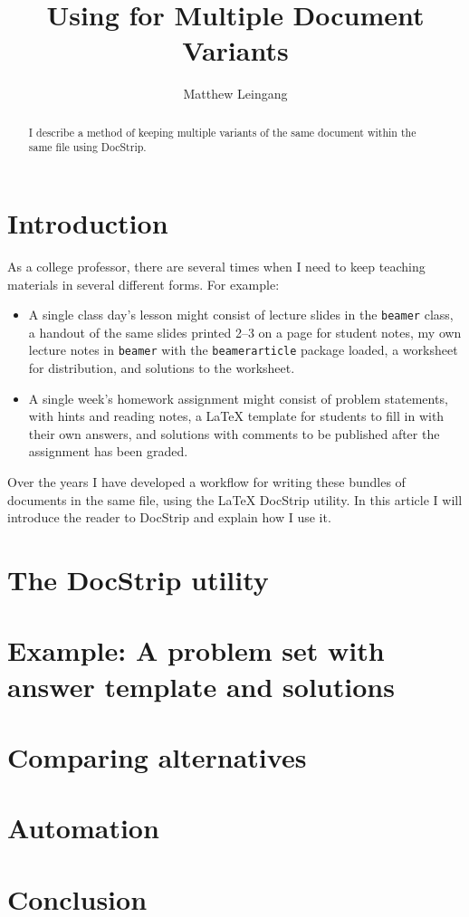 \documentclass{ltugboat}
\title{Using \docstrip{} for Multiple Document Variants}
\author{Matthew Leingang}
\newcommand{\cls}[1]{\texttt{#1}}
\newcommand{\pkg}[1]{\texttt{#1}}
\newcommand{\docstrip}{\textsf{DocStrip}}
\begin{document}
\maketitle

\begin{abstract}
    I describe a method of keeping multiple variants of the same document
    within the same file using \docstrip.
\end{abstract}

\section{Introduction}

As a college professor, there are several times when I need to keep teaching
materials in several different forms.  For example:

\begin{itemize}
    \item A single class day's lesson might consist of lecture slides in the
    \cls{beamer} class, a handout of the same slides printed 2–3 on a page for
    student notes, my own lecture notes in \cls{beamer} with the
    \pkg{beamerarticle} package loaded, a worksheet for distribution, and
    solutions to the worksheet.

    \item A single week's homework assignment might consist of problem
    statements, with hints and reading notes, a \LaTeX{} template for students
    to fill in with their own answers, and solutions with comments to be
    published after the assignment has been graded.
\end{itemize}

Over the years I have developed a workflow for writing these bundles of
documents in the same file, using the \LaTeX{} \docstrip{} utility.  In this
article I will introduce the reader to \docstrip{} and explain how I use it.

\section{The \docstrip{} utility}

\section{Example: A problem set with answer template and solutions}

\section{Comparing alternatives}

\section{Automation}

\section{Conclusion}

\nocite{book-minimal}      %

\makesignature
\end{document}

